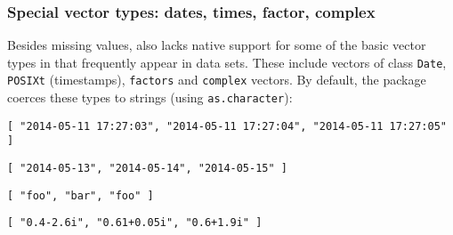 \subsubsection{Special vector types: dates, times, factor, complex}

Besides missing values, \JSON also lacks native support for some of the basic vector types in \R that frequently appear in data sets. These include vectors of class \texttt{Date}, \texttt{POSIXt} (timestamps), \texttt{factors} and \texttt{complex} vectors. By default, the \jsonlite package coerces these types to strings (using \texttt{as.character}):

\begin{knitrout}\mycodesize
{}\color{fgcolor}\begin{kframe}
\begin{alltt}
\hlstd{(}\hlstd{(}\hlstd{()} \hlopt{+} \hlopt{:}\hlstd{))}
\end{alltt}
\begin{verbatim}
[ "2014-05-11 17:27:03", "2014-05-11 17:27:04", "2014-05-11 17:27:05" ]
\end{verbatim}
\begin{alltt}
\hlstd{(}\hlstd{(}\hlstd{(}\hlstd{())} \hlopt{+} \hlopt{:}\hlstd{))}
\end{alltt}
\begin{verbatim}
[ "2014-05-13", "2014-05-14", "2014-05-15" ]
\end{verbatim}
\begin{alltt}
\hlstd{(}\hlstd{(}\hlstd{(}\hlstd{(}\hlstd{,} \hlstd{,} \hlstd{))))}
\end{alltt}
\begin{verbatim}
[ "foo", "bar", "foo" ]
\end{verbatim}
\begin{alltt}
\hlstd{(}\hlstd{(}\hlstd{(} \hlstd{=} \hlstd{(}\hlstd{),}  \hlstd{=} \hlstd{(}\hlstd{))))}
\end{alltt}
\begin{verbatim}
[ "0.4-2.6i", "0.61+0.05i", "0.6+1.9i" ]
\end{verbatim}
\end{kframe}
\end{knitrout}



